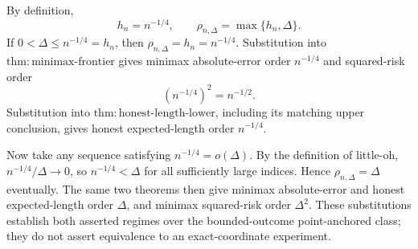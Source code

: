 By definition,
\[
 h_n=n^{-1/4},
 \qquad
 \rho_{n,\Delta}=\max\{h_n,\Delta\}.
\]
If \(0<\Delta\leq n^{-1/4}=h_n\), then \(\rho_{n,\Delta}=h_n=n^{-1/4}\).  Substitution into \(\mathrm{thm:minimax\text{-}frontier}\) gives minimax absolute-error order \(n^{-1/4}\) and squared-risk order
\[
 (n^{-1/4})^2=n^{-1/2}.
\]
Substitution into \(\mathrm{thm:honest\text{-}length\text{-}lower}\), including its matching upper conclusion, gives honest expected-length order \(n^{-1/4}\).

Now take any sequence satisfying \(n^{-1/4}=o(\Delta)\).  By the definition of little-oh, \(n^{-1/4}/\Delta\to0\), so \(n^{-1/4}<\Delta\) for all sufficiently large indices.  Hence \(\rho_{n,\Delta}=\Delta\) eventually.  The same two theorems then give minimax absolute-error and honest expected-length order \(\Delta\), and minimax squared-risk order \(\Delta^2\).  These substitutions establish both asserted regimes over the bounded-outcome point-anchored class; they do not assert equivalence to an exact-coordinate experiment.